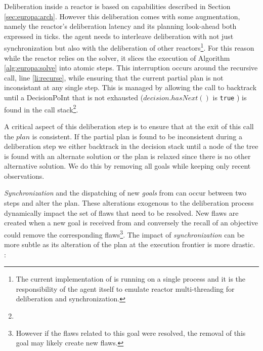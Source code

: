 Deliberation inside a reactor is based on \eu capabilities described
in Section \ref{sec:europa:arch}. However this deliberation comes with
some augmentation, namely the reactor's deliberation latency
\kcomment{($\lambda$)} and its planning look-ahead \kcomment{($\pi$)}
both expressed in ticks.  the agent needs to
interleave deliberation with not just synchronization but also with
the deliberation of other reactors\footnote{The current implementation
  of \rx is running on a single process and it is the responsibility
  of the agent itself to emulate reactor multi-threading for
  deliberation and synchronization.}.  For this reason while the
reactor relies on the \eu solver, it slices the execution of Algorithm
\ref{alg:europa:solve} into atomic steps. This interruption occurs
around the recursive call, line \ref{li:recurse}, while ensuring that
the current partial plan is not inconsistant at any single step. This
is managed by allowing the call to backtrack until a
\textsf{DecisionPoInt} that is not exhausted (\ie $decision.hasNext()$
is \texttt{true} ) is found in the call
stack\footnote{}.

A critical aspect of this deliberation step is to ensure that at the
exit of this call the $plan$ is consistent.  If the partial plan is
found to be inconsistent during a deliberation step we either
backtrack in the decision stack until a node of the 
tree is found with an alternate solution or the plan is relaxed since
there is no other alternative solution. We do this by removing all
goals while keeping only recent observations.

{\em Synchronization} and the dispatching of new {\em goals} from \rx
can occur between two steps and alter the plan. These alterations
exogenous to the deliberation process dynamically impact the set of
flaws that need to be resolved. New flaws are created when a new goal
is received from \rx and conversely the recall of an objective could
remove the corresponding flaws\footnote{However if the flaws related
  to this goal were resolved, the removal of this goal may likely
  create new flaws.}. The impact of {\em synchronization} can be more
subtle as its alteration of the plan at the execution frontier is more
drastic. :

